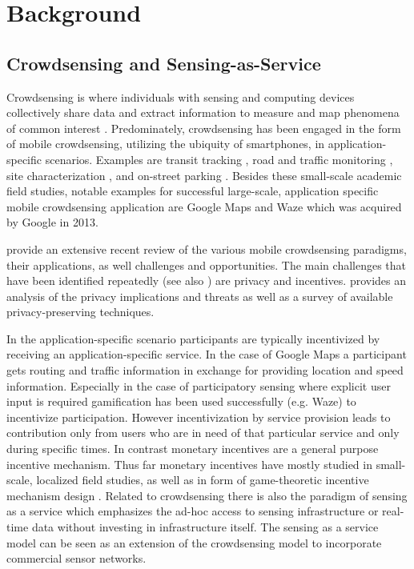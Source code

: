 \documentclass[10pt,journal,compsoc]{IEEEtran}
\begin{document}
\section{Background}

\subsection{Crowdsensing and Sensing-as-Service}
\label{sec:crowdsensing}

Crowdsensing is where individuals with sensing and computing devices collectively share data and extract information to measure and map phenomena of common interest \cite{ganti2011mobile}. Predominately, crowdsensing has been engaged in the form of mobile crowdsensing, utilizing the ubiquity of smartphones, in application-specific scenarios. Examples are transit tracking \cite{Thiagarajan:2010:CTT:1869983.1869993}, road and traffic monitoring \cite{Mohan:2008:NRM:1460412.1460444}, site characterization \cite{Chon:2012:ACP:2370216.2370288}, and on-street parking \cite{Chen:2012:COS:2386958.2386960,6569416}. Besides these small-scale academic field studies, notable examples for successful large-scale, application specific mobile crowdsensing application are Google Maps and Waze which was acquired by Google in 2013.   

\cite{guo2015mobile} provide an extensive recent review of the various mobile crowdsensing paradigms, their applications, as well challenges and opportunities. 
The main challenges that have been identified repeatedly (see also \cite{he2015privacy}) are privacy and incentives. \cite{Christin2015} provides an analysis of the privacy implications and threats as well as a survey of available privacy-preserving techniques. 

In the application-specific scenario participants are typically incentivized by receiving an application-specific service. In the case of Google Maps a participant gets routing and traffic information in exchange for providing location and speed information. Especially in the case of participatory sensing where explicit user input is required gamification \cite{Deterding:2011:GDE:2181037.2181040} has been used successfully (e.g. Waze) to incentivize participation. However incentivization by service provision leads to contribution only from users who are in need of that particular service and only during specific times. In contrast monetary incentives are a general purpose incentive mechanism. Thus far monetary incentives have mostly studied in small-scale, localized field studies, as well as in form of game-theoretic incentive mechanism design \cite{7101300}. 
Related to crowdsensing there is also the paradigm of sensing as a service \cite{Sheng:2013cm,ETT:ETT2704} which emphasizes the ad-hoc access to sensing infrastructure or real-time data without investing in infrastructure itself. The sensing as a service model can be seen as an extension of the crowdsensing model to incorporate commercial sensor networks.
\end{document}
